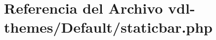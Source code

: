 \hypertarget{staticbar_8php}{\section{Referencia del Archivo vdl-\/themes/\-Default/staticbar.php}
\label{staticbar_8php}
}
